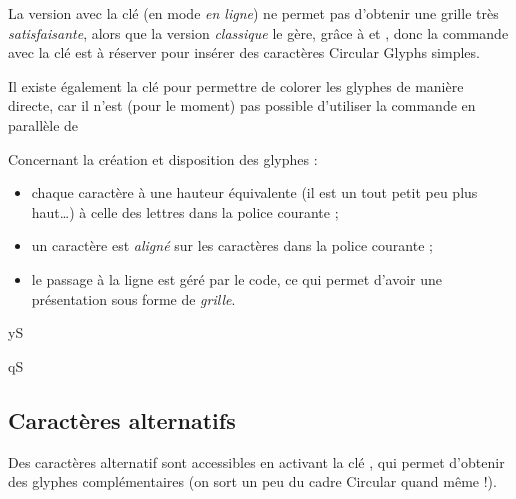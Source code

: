 \documentclass[french,11pt,a4paper]{article}
\begin{document}
\begin{DemoCode}[]
\end{DemoCode}

La version avec la clé \MontreCode{[Inline]} (en mode \textit{en ligne}) ne permet pas d'obtenir une grille très \textit{satisfaisante}, alors que la version \textit{classique} le gère, grâce à  et , donc la commande avec la clé \MontreCode{[Inline]} est à réserver pour insérer des caractères \textsf{Circular Glyphs} simples.

\medskip

Il existe également la clé \MontreCode{[Color=...]} pour permettre de colorer les glyphes de manière directe, car il n'est (pour le moment) pas possible d'utiliser la commande en parallèle de 

\medskip

Concernant la création et disposition des glyphes :

\begin{itemize}
	\item chaque caractère à une hauteur équivalente (il est un tout petit peu plus haut\ldots) à celle des lettres  dans la police courante ;
	\item un caractère est \textit{aligné} sur les caractères  dans la police courante ;
	\item le passage à la ligne est géré par le code, ce qui permet d'avoir une présentation sous forme de \textit{grille}.
\end{itemize}

\begin{DemoCode}[]
yS
\end{DemoCode}

\begin{DemoCode}[]
{\LARGE\sffamily qS}
\end{DemoCode}

\pagebreak

\subsection{Caractères alternatifs}

Des caractères alternatif sont accessibles en activant la clé \MontreCode{[Ext]}, qui permet d'obtenir des glyphes complémentaires (on sort un peu du cadre \textsf{Circular} quand même !).
\end{document}
